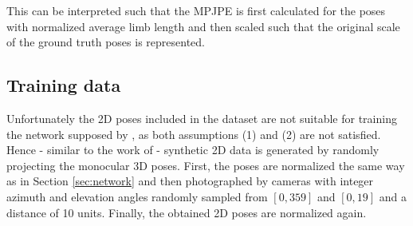 This can be interpreted such that the MPJPE is first calculated for the poses with normalized average limb length and then scaled such that the original scale of the ground truth poses is represented. 

\subsection{Training data}\label{sec:data-results}

Unfortunately the 2D poses included in the dataset are not suitable for training the network supposed by \citet{drover18}, as both assumptions (1) and (2) are not satisfied.
Hence - similar to the work of \citet{drover18} - synthetic 2D data is generated by randomly projecting the monocular 3D poses.
First, the poses are normalized the same way as in Section \ref{sec:network} and then photographed by cameras with integer azimuth and elevation angles randomly sampled from $[0, 359]$ and $[0, 19]$ and a distance of 10 units.
Finally, the obtained 2D poses are normalized again.